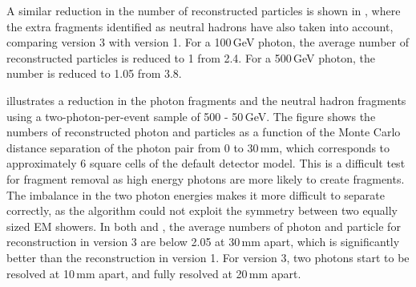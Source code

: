A similar  reduction in the number of reconstructed particles is shown in , where the extra fragments identified as neutral hadrons have also taken into account, comparing \pandora version 3 with version 1. For a 100\,GeV photon, the average number of reconstructed particles is reduced to 1 from 2.4. For a 500\,GeV photon, the number is reduced to 1.05 from 3.8.


 illustrates a reduction in the photon fragments and the neutral hadron fragments using a two-photon-per-event sample of 500 - 50\,GeV. The figure shows the numbers of reconstructed photon and particles as a function of  the Monte Carlo distance separation of the photon pair from 0 to 30\,mm, which corresponds to approximately 6 \ECAL square cells of the default \ILD detector model. This is a difficult test for fragment removal as high energy photons are more likely to create fragments. The imbalance in the two photon energies makes it more difficult to separate correctly, as the \peakFinding algorithm could not exploit the symmetry between two equally sized EM showers.  In both  and , the average numbers of photon and particle for reconstruction in \pandora version 3 are below 2.05 at 30\,mm apart, which is significantly better than the reconstruction in \pandora version 1. For \pandora version 3, two photons start to be resolved at 10\,mm apart, and fully resolved at 20\,mm apart.

